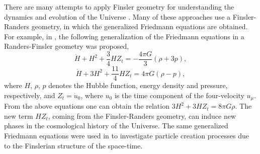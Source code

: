 \documentclass[aps,superscriptaddress, showpacs,preprintnumbers, superscriptaddress, nofootinbibt,twocolumn]{revtex4-2}
\def\be{\begin{equation}}
\def\ee{\end{equation}}
\begin{document}
There are many attempts to apply Finsler geometry for understanding the dynamics and evolution of the Universe \cite{Fc1,Fc2,Fc3,Fc4,Fc5,Fc6,Fc7,Fc8,Fc9,Fc10,Fc11,Fc12,Fc13,Fc14,Fc15,Fc16,Fc17,Fc18,Fc19,Fc19a, Fc20,Fc21,Fc22,Fc23, Fc24, Fc24a}.  Many of these approaches use a Finsler-Randers geometry, in which the generalized Friedmann equations are obtained. For example, in \cite{Fc23}, the following generalization of the Friedmann equations in a Randers-Finsler geometry was proposed,
\be
\dot{H}+H^2+\frac{3}{4}HZ_t=-\frac{4\pi G}{3}\left(\rho +3p\right),
\ee
\be
\dot{H}+3H^2+\frac{11}{4}HZ_t=4\pi G\left(\rho -p\right),
\ee
where $H$, $\rho$, $p$ denotes the Hubble function, energy density and pressure, respectively, and $Z_t=\dot{u}_0$, where $u_0$ is the time component of the four-velocity $u_{\mu}$. From the above equations one can obtain the relation $3H^2+3HZ_t=8\pi G \rho$. The new term $HZ_t$, coming from the Finsler-Randers geometry, can induce new phases in the cosmological history of the Universe. The same generalized Friedmann equations were used in \cite{Fc20} to investigate particle creation processes due to the Finslerian structure of the space-time.
\end{document}
